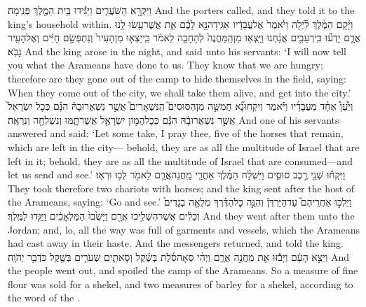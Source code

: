 {וַיִּקְרָ֖א הַשֹּׁעֲרִ֑ים וַיַּגִּ֕ידוּ בֵּ֥ית הַמֶּ֖לֶךְ פְּנִֽימָה׃}
{And the porters called, and they told it to the king’s household within.}
{וַיָּ֨קׇם הַמֶּ֜לֶךְ לַ֗יְלָה וַיֹּ֙אמֶר֙ אֶל\maqqaf עֲבָדָ֔יו אַגִּֽידָה\maqqaf נָּ֣א לָכֶ֔ם אֵ֛ת אֲשֶׁר\maqqaf עָ֥שׂוּ לָ֖נוּ אֲרָ֑ם יָדְע֞וּ כִּֽי\maqqaf רְעֵבִ֣ים אֲנַ֗חְנוּ וַיֵּֽצְא֤וּ מִן\maqqaf הַֽמַּחֲנֶה֙ לְהֵחָבֵ֤ה  לֵאמֹ֔ר כִּֽי\maqqaf יֵצְא֤וּ מִן\maqqaf הָעִיר֙ וְנִתְפְּשֵׂ֣ם חַיִּ֔ים וְאֶל\maqqaf הָעִ֖יר נָבֹֽא׃}
{And the king arose in the night, and said unto his servants: ‘I will now tell you what the Arameans have done to us. They know that we are hungry; therefore are they gone out of the camp to hide themselves in the field, saying: When they come out of the city, we shall take them alive, and get into the city.’}
{וַיַּ֩עַן֩ אֶחָ֨ד מֵעֲבָדָ֜יו וַיֹּ֗אמֶר וְיִקְחוּ\maqqaf נָ֞א חֲמִשָּׁ֣ה מִן\maqqaf הַסּוּסִים֮ הַֽנִּשְׁאָרִים֮ אֲשֶׁ֣ר נִשְׁאֲרוּ\maqqaf בָהּ֒ הִנָּ֗ם כְּכׇל\maqqaf {} יִשְׂרָאֵל֙ אֲשֶׁ֣ר נִשְׁאֲרוּ\maqqaf בָ֔הּ הִנָּ֕ם כְּכׇל\maqqaf הֲמ֥וֹן יִשְׂרָאֵ֖ל אֲשֶׁר\maqqaf תָּ֑מּוּ וְנִשְׁלְחָ֖ה וְנִרְאֶֽה׃}
{And one of his servants answered and said: ‘Let some take, I pray thee, five of the horses that remain, which are left in the city— behold, they are as all the multitude of Israel that are left in it; behold, they are as all the multitude of Israel that are consumed—and let us send and see.’}
{וַיִּקְח֕וּ שְׁנֵ֖י רֶ֣כֶב סוּסִ֑ים וַיִּשְׁלַ֨ח הַמֶּ֜לֶךְ אַחֲרֵ֧י מַֽחֲנֵה\maqqaf אֲרָ֛ם לֵאמֹ֖ר לְכ֥וּ וּרְאֽוּ׃}
{They took therefore two chariots with horses; and the king sent after the host of the Arameans, saying: ‘Go and see.’}
{וַיֵּלְכ֣וּ אַחֲרֵיהֶם֮ עַד\maqqaf הַיַּרְדֵּן֒ וְהִנֵּ֣ה כׇל\maqqaf הַדֶּ֗רֶךְ מְלֵאָ֤ה בְגָדִים֙ וְכֵלִ֔ים אֲשֶׁר\maqqaf הִשְׁלִ֥יכוּ אֲרָ֖ם  וַיָּשֻׁ֙בוּ֙ הַמַּלְאָכִ֔ים וַיַּגִּ֖דוּ לַמֶּֽלֶךְ׃}
{And they went after them unto the Jordan; and, lo, all the way was full of garments and vessels, which the Arameans had cast away in their haste. And the messengers returned, and told the king.}
{וַיֵּצֵ֣א הָעָ֔ם וַיָּבֹ֕זּוּ אֵ֖ת מַחֲנֵ֣ה אֲרָ֑ם וַיְהִ֨י סְאָה\maqqaf סֹ֜לֶת בְּשֶׁ֗קֶל וְסָאתַ֧יִם שְׂעֹרִ֛ים בְּשֶׁ֖קֶל כִּדְבַ֥ר יְהֹוָֽה׃}
{And the people went out, and spoiled the camp of the Arameans. So a measure of fine flour was sold for a shekel, and two measures of barley for a shekel, according to the word of the \lord.}
